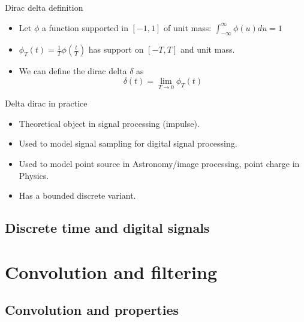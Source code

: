   \begin{block}{ Dirac delta definition}

    \begin{itemize}
      \item Let $\phi$ a function supported in $[-1,1]$ of unit mass: $\int_{-\infty}^\infty \phi(u)du=1$ 
      \item  $\phi_T(t)=\frac{1}{T}\phi(\frac{t}{T})$ has support on $[-T,T]$ and unit mass.
      \item We can define the dirac delta $\delta$ as
      $$ \delta(t)=\lim_{T\rightarrow 0} \phi_T(t) $$


    \end{itemize}
    
    
    \end{block}


    \begin{block}{Delta dirac in practice}
      \begin{itemize}
        \item Theoretical object in signal processing (impulse).
        \item Used to model signal sampling for digital signal processing.
        \item Used to model point source  in Astronomy/image processing, point charge in Physics.
        \item Has a bounded discrete variant.
      \end{itemize}
    \end{block}

    \subsection{Discrete time and digital signals}
    \label{sec:}
    

\section{Convolution and filtering}
\label{sec:conv_filtering}

\subsection{Convolution and properties}
\label{sec:}

